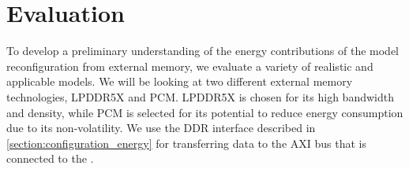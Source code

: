 \section{Evaluation}

To develop a preliminary understanding of the energy contributions of the model reconfiguration from external memory, we evaluate a variety of realistic and applicable models.
We will be looking at two different external memory technologies, LPDDR5X and PCM.
LPDDR5X is chosen for its high bandwidth and density, while PCM is selected for its potential to reduce energy consumption due to its non-volatility.
We use the DDR interface described in \cref{section:configuration_energy} for transferring data to the AXI bus that is connected to the \graicore{}.

